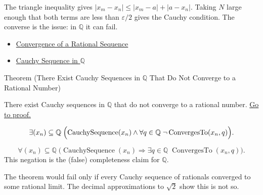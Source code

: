 \begin{remark*}[Interpretation]
The triangle inequality gives $|x_m - x_n| \le |x_m - a| + |a - x_n|$.
Taking $N$ large enough that both terms are less than $\varepsilon/2$ gives the
Cauchy condition. The converse is the issue: in $\mathbb{Q}$ it can fail.
\end{remark*}

\begin{dependencies}
\begin{itemize}
  \item \hyperref[def:convergent-rational-sequence]{Convergence of a Rational Sequence}
  \item \hyperref[def:cauchy-rational]{Cauchy Sequence in $\mathbb{Q}$}
\end{itemize}
\end{dependencies}

\begin{theorembox}{Theorem (There Exist Cauchy Sequences in $\mathbb{Q}$ That Do Not Converge to a Rational Number)}
\begin{theorem}
\label{thm:cauchy-not-convergent-q}
There exist Cauchy sequences in $\mathbb{Q}$ that do not converge to a
rational number.
\hyperref[prf:cauchy-not-convergent-q]{Go to proof.}
\end{theorem}
\end{theorembox}

\begin{remark*}
\[
\exists (x_n)\subseteq \mathbb{Q}\;
\Bigl(
\operatorname{CauchySequence}(x_n)
\land
\forall q\in\mathbb{Q}\;\neg\operatorname{ConvergesTo}(x_n,q)
\Bigr).
\]
\end{remark*}

\begin{remark*}
\[
\forall (x_n)\subseteq \mathbb{Q}\;
\bigl(
\operatorname{CauchySequence}(x_n)
\Longrightarrow
\exists q\in\mathbb{Q}\;\operatorname{ConvergesTo}(x_n,q)
\bigr).
\]
This negation is the (false) completeness claim for $\mathbb{Q}$.
\end{remark*}

\begin{remark*}
The theorem would fail only if every Cauchy sequence of rationals converged
to some rational limit. The decimal approximations to $\sqrt{2}$ show this
is not so.
\end{remark*}

